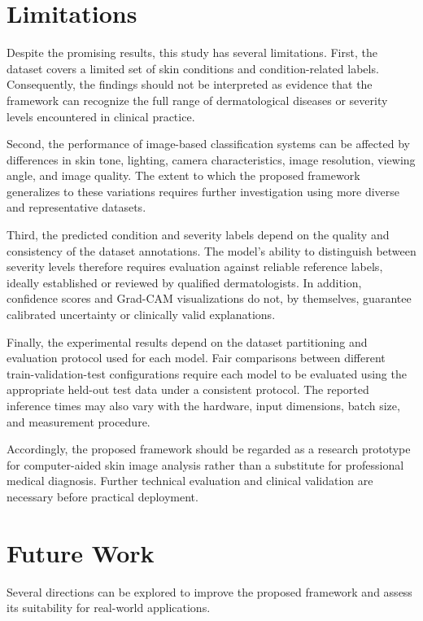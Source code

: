 \section{Limitations}

Despite the promising results, this study has several limitations. First, the dataset covers a limited set of skin conditions and condition-related labels. Consequently, the findings should not be interpreted as evidence that the framework can recognize the full range of dermatological diseases or severity levels encountered in clinical practice.

Second, the performance of image-based classification systems can be affected by differences in skin tone, lighting, camera characteristics, image resolution, viewing angle, and image quality. The extent to which the proposed framework generalizes to these variations requires further investigation using more diverse and representative datasets.

Third, the predicted condition and severity labels depend on the quality and consistency of the dataset annotations. The model's ability to distinguish between severity levels therefore requires evaluation against reliable reference labels, ideally established or reviewed by qualified dermatologists. In addition, confidence scores and Grad-CAM visualizations do not, by themselves, guarantee calibrated uncertainty or clinically valid explanations.

Finally, the experimental results depend on the dataset partitioning and evaluation protocol used for each model. Fair comparisons between different train-validation-test configurations require each model to be evaluated using the appropriate held-out test data under a consistent protocol. The reported inference times may also vary with the hardware, input dimensions, batch size, and measurement procedure.

Accordingly, the proposed framework should be regarded as a research prototype for computer-aided skin image analysis rather than a substitute for professional medical diagnosis. Further technical evaluation and clinical validation are necessary before practical deployment.

\section{Future Work}

Several directions can be explored to improve the proposed framework and assess its suitability for real-world applications.

